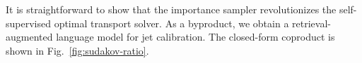 It is straightforward to show that the importance sampler revolutionizes
the self-supervised optimal transport solver. As a byproduct, we obtain
a retrieval-augmented language model for jet calibration. The
closed-form coproduct is shown in Fig.~\ref{fig:sudakov-ratio}.

